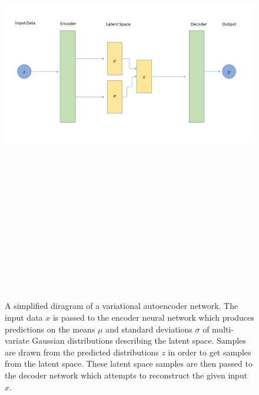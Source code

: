 \begin{figure}
    \centering
    \includegraphics[width=16cm,height=20cm,keepaspectratio]{figures/simple_vae_diagram.png}
    \caption[Simple variational autoencoder network illustration]{A simplified diragram of a variational autoencoder network. The input data $x$ is passed to the encoder neural network which produces predictions on the means $\mu$ and standard deviations $\sigma$ of multi-variate Gaussian distributions describing the latent space. Samples are drawn from the predicted distributions $z$ in order to get samples from the latent space. These latent space samples are then passed to the decoder network which attempts to reconstruct the given input $x$.}
    \label{fig:simple_vae}
\end{figure}


